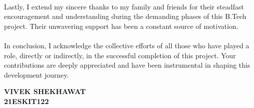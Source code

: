 \large{\paragraph{}
Lastly, I extend my sincere thanks to my family and friends for their steadfast encouragement and understanding during the demanding phases of this B.Tech project. Their unwavering support has been a constant source of motivation.}

\large{\paragraph{}
In conclusion, I acknowledge the collective efforts of all those who have played a role, directly or indirectly, in the successful completion of this project. Your contributions are deeply appreciated and have been instrumental in shaping this development journey.}

\begin{flushright}
{
\vspace{1cm}
\textbf{VIVEK SHEKHAWAT}\\
\textbf{21ESKIT122}\\
\vspace{.5cm}
}
\end{flushright}
\newpage
